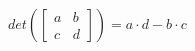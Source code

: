 \documentclass[10pt,convert]{standalone}
\begin{document}
$ det (\begin{bmatrix}
a  & b \\
c  & d
\end{bmatrix}) = a \cdot d - b \cdot c  $
\end{document}
